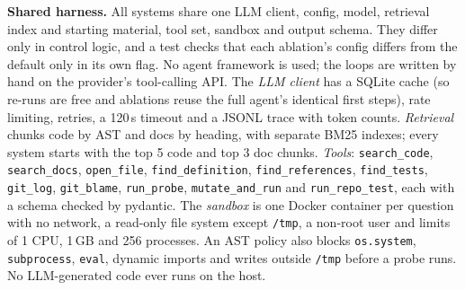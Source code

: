 \documentclass[10pt,a4paper]{article}
\newcommand{\code}[1]{\texttt{\small #1}}
\begin{document}
\textbf{Shared harness.} All systems share one LLM client, config, model, retrieval index and starting material, tool
set, sandbox and output schema. They differ only in control logic, and a test checks that each ablation's config
differs from the default only in its own flag. No agent framework is used; the loops are written by hand on the
provider's tool-calling API. The \emph{LLM client} has a SQLite cache (so re-runs are free and ablations reuse the full
agent's identical first steps), rate limiting, retries, a 120\,s timeout and a JSONL trace with token counts.
\emph{Retrieval} chunks code by AST and docs by heading, with separate BM25 indexes; every system starts with the top 5
code and top 3 doc chunks. \emph{Tools}: \code{search\_code}, \code{search\_docs}, \code{open\_file},
\code{find\_definition}, \code{find\_references}, \code{find\_tests}, \code{git\_log}, \code{git\_blame},
\code{run\_probe}, \code{mutate\_and\_run} and \code{run\_repo\_test}, each with a schema checked by pydantic. The
\emph{sandbox} is one Docker container per question with no network, a read-only file system except \code{/tmp}, a
non-root user and limits of 1 CPU, 1\,GB and 256 processes. An AST policy also blocks \code{os.system},
\code{subprocess}, \code{eval}, dynamic imports and writes outside \code{/tmp} before a probe runs. No LLM-generated
code ever runs on the host.
\end{document}
